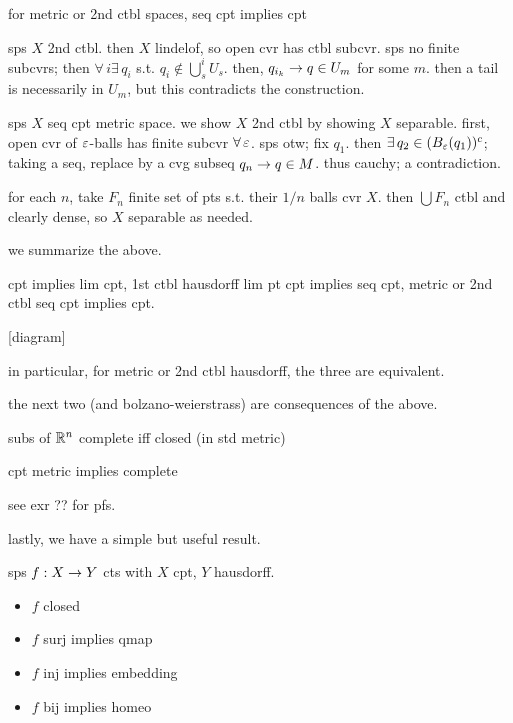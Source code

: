 \begin{prop}
    for metric or 2nd ctbl spaces, seq cpt implies cpt
\end{prop}

\begin{pf}[source=Primary Source Material]
    sps $X$ 2nd ctbl.
    then $X$ lindelof, so open cvr has ctbl subcvr.
    sps no finite subcvrs;
    then $\forall \, i\exists \, q_{i}$ s.t. $q_{i} \notin\bigcup_{s}^{i}U_{s}$.
    then, $q_{i_{k}}\rightarrow q\in U_{m}$ for some $m$.
    then a tail is necessarily in $U_{m}$, but this contradicts the construction.

    sps $X$ seq cpt metric space.
    we show $X$ 2nd ctbl by showing $X$ separable.
    first, open cvr of $\varepsilon$-balls has finite subcvr $\forall \, \varepsilon$.
    sps otw; fix $q_{1}$. then $\exists \, q_{2}\in(B_{\varepsilon}(q_{1}))^{c}$;
    taking a seq, replace by a cvg subseq $q_{n}\rightarrow q\in M$.
    thus cauchy; a contradiction.

    for each $n$, take $F_{n}$ finite set of pts s.t. their $1/n$ balls cvr $X$.
    then $\bigcup F_{n}$ ctbl and clearly dense, so $X$ separable as needed.
\end{pf}
we summarize the above.

\begin{thm}
    cpt implies lim cpt, 1st ctbl hausdorff lim pt cpt implies seq cpt,
    metric or 2nd ctbl seq cpt implies cpt.

    [diagram]

    in particular, for metric or 2nd ctbl hausdorff, the three are equivalent.
\end{thm}
the next two (and bolzano-weierstrass) are consequences of the above.

\begin{thm}
    subs of $\mathbb{R}^{n}$ complete iff closed (in std metric)
\end{thm}

\begin{thm}
    cpt metric implies complete
\end{thm}
see exr ?? for pfs.

lastly, we have a simple but useful result. \
\begin{lm}[title=Closed Map Lemma]
    sps $f:X\rightarrow Y$ cts with $X$ cpt, $Y$ hausdorff. \vspace{-0.275in}
    \begin{itemize}[parsep=3pt]
        \item $f$ closed
        \item $f$ surj implies qmap
        \item $f$ inj implies embedding
        \item $f$ bij implies homeo
    \end{itemize}
\end{lm}

